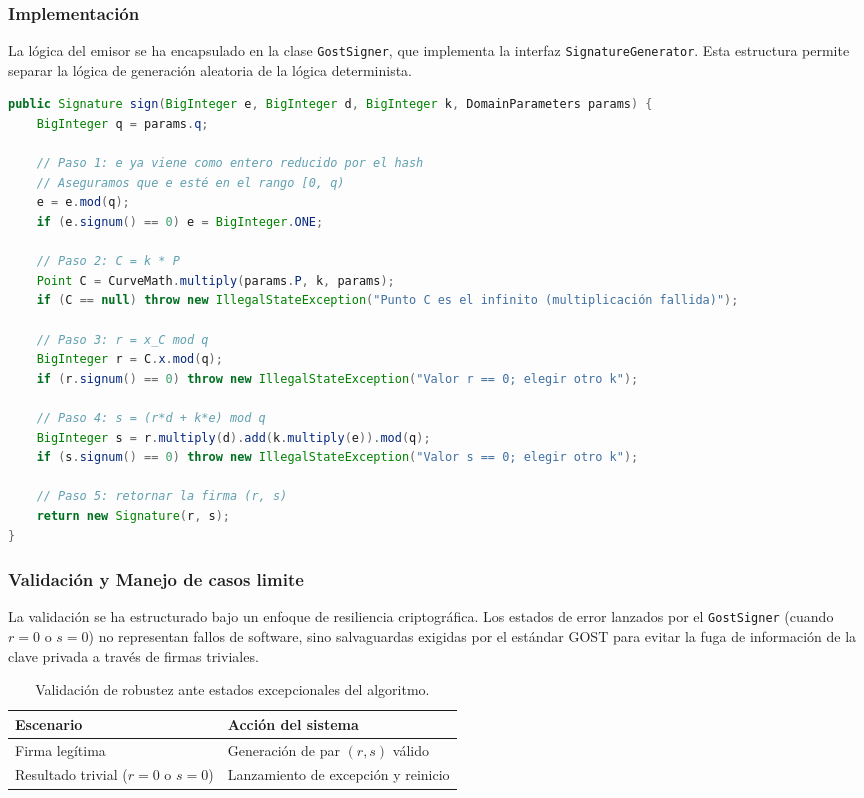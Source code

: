 \subsubsection{Implementación}

La lógica del emisor se ha encapsulado en la clase \texttt{GostSigner}, que implementa la interfaz \texttt{SignatureGenerator}. Esta estructura permite separar la lógica de generación aleatoria de la lógica determinista.

\begin{lstlisting}[language=Java, caption={Método \texttt{sign} de la clase \texttt{GostSigner}: Implementacion del Algoritmo I.}]
public Signature sign(BigInteger e, BigInteger d, BigInteger k, DomainParameters params) {
    BigInteger q = params.q;

    // Paso 1: e ya viene como entero reducido por el hash
    // Aseguramos que e esté en el rango [0, q)
    e = e.mod(q);
    if (e.signum() == 0) e = BigInteger.ONE;

    // Paso 2: C = k * P
    Point C = CurveMath.multiply(params.P, k, params);
    if (C == null) throw new IllegalStateException("Punto C es el infinito (multiplicación fallida)");

    // Paso 3: r = x_C mod q
    BigInteger r = C.x.mod(q);
    if (r.signum() == 0) throw new IllegalStateException("Valor r == 0; elegir otro k");

    // Paso 4: s = (r*d + k*e) mod q
    BigInteger s = r.multiply(d).add(k.multiply(e)).mod(q);
    if (s.signum() == 0) throw new IllegalStateException("Valor s == 0; elegir otro k");

    // Paso 5: retornar la firma (r, s)
    return new Signature(r, s);
}
\end{lstlisting}

\subsubsection{Validación y Manejo de casos limite}

La validación se ha estructurado bajo un enfoque de resiliencia criptográfica. Los estados de error lanzados por el \texttt{GostSigner} (cuando $r=0$ o $s=0$) no representan fallos de software, sino salvaguardas exigidas por el estándar GOST para evitar la fuga de información de la clave privada a través de firmas triviales.

\begin{table}[H]
    \centering
    \begin{tabular}{@{}ll@{}}
        \toprule
        \textbf{Escenario} & \textbf{Acción del sistema} \\ \midrule
        Firma legítima & Generación de par $(r, s)$ válido \\
        Resultado trivial ($r=0$ o $s=0$) & Lanzamiento de excepción y reinicio \\ \bottomrule
    \end{tabular}
    \caption{Validación de robustez ante estados excepcionales del algoritmo.}
    \label{tab:tests_generador}
\end{table}

